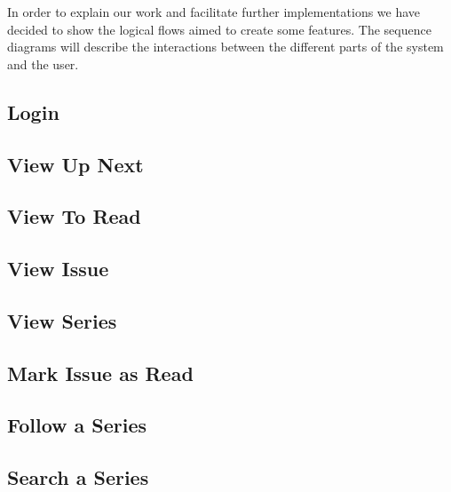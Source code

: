 In order to explain our work and facilitate further implementations we have decided to show the logical flows aimed to create some features. The sequence diagrams will describe the interactions between the different parts of the system and the user.

\vspace{8mm}

\subsection{Login}

\clearpage

\subsection{View Up Next}

\clearpage

\subsection{View To Read}

\clearpage

\subsection{View Issue}

\clearpage

\subsection{View Series}

\clearpage

\subsection{Mark Issue as Read}

\clearpage

\subsection{Follow a Series}


\clearpage

\subsection{Search a Series}

